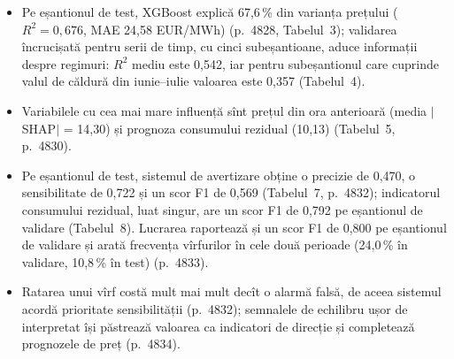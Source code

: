 \textbf{}
\begin{itemize}
\item {}%
{Pe eșantionul de test, XGBoost explică 67,6\,\% din varianța prețului ($R^2 = 0{,}676$, MAE 24,58 EUR/MWh) (p.~4828, Tabelul~3); validarea încrucișată pentru serii de timp, cu cinci subeșantioane, aduce informații despre regimuri: $R^2$ mediu este 0,542, iar pentru subeșantionul care cuprinde valul de căldură din iunie--iulie valoarea este 0,357 (Tabelul~4).}
\item {}%
{Variabilele cu cea mai mare influență sînt prețul din ora anterioară (media $|$SHAP$|$ = 14,30) și prognoza consumului rezidual (10,13) (Tabelul~5, p.~4830).}
\item {}%
{Pe eșantionul de test, sistemul de avertizare obține o precizie de 0,470, o sensibilitate de 0,722 și un scor F1 de 0,569 (Tabelul~7, p.~4832); indicatorul consumului rezidual, luat singur, are un scor F1 de 0,792 pe eșantionul de validare (Tabelul~8).
Lucrarea raportează și un scor F1 de 0,800 pe eșantionul de validare și arată frecvența vîrfurilor în cele două perioade (24,0\,\% în validare, 10,8\,\% în test) (p.~4833).}
\item {}%
{Ratarea unui vîrf costă mult mai mult decît o alarmă falsă, de aceea sistemul acordă prioritate sensibilității (p.~4832); semnalele de echilibru ușor de interpretat își păstrează valoarea ca indicatori de direcție și completează prognozele de preț (p.~4834).}
\end{itemize}
